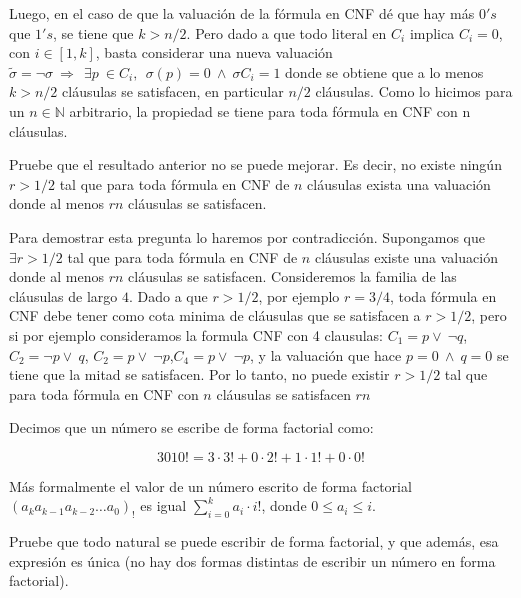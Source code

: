 \documentclass[letterpaper,10pt]{article}
\begin{document}
Luego, en el caso de que la valuación de la fórmula en CNF dé que hay más $0's$ que $1's$, se tiene que  $k>n/2$. Pero dado a que todo literal en $C_{i}$ implica $C_i=0$, con $i \in [1,k]$, basta considerar una nueva valuación $\widetilde{\sigma} = \neg \sigma\ \Rightarrow\ \ \exists p\ \in C_i,\ \ \sigma(p) = 0\ \wedge\ \sigma C_i = 1 $ donde se obtiene que a lo menos $k>n/2$ cláusulas se satisfacen, en particular $n/2$ cláusulas. Como lo hicimos para un $n \in \mathbb{N}$ arbitrario, la propiedad se tiene para toda fórmula en CNF con n cláusulas.
\\

\begin{tcolorbox}
 Pruebe que el resultado anterior no se puede mejorar. Es decir, no existe ningún $r >1/2$ tal que para toda fórmula en CNF de $n$ cláusulas exista una valuación donde al menos $rn$ cláusulas se satisfacen.
\end{tcolorbox}

Para demostrar esta pregunta lo haremos por contradicción. Supongamos que $\exists r>1/2$ tal que para toda fórmula en CNF de $n$ cláusulas existe una valuación donde al menos $rn$ cláusulas se satisfacen. Consideremos la familia de las cláusulas de largo $4$. Dado a que $r>1/2$, por ejemplo $r=3/4$, toda fórmula en CNF debe tener como cota minima de cláusulas que se satisfacen a $r>1/2$, pero si por ejemplo consideramos la formula CNF con 4 clausulas: $C_1 = p \vee\ \neg q$, $C_2 = \neg p \vee\  q$, $C_2 = p \vee\ \neg p$,$C_4 = p \vee\ \neg p$, y la valuación que hace $p=0\ \wedge\ q=0$ se tiene que la mitad se satisfacen. Por lo tanto, no puede existir $r>1/2$ tal que para toda fórmula en CNF con $n$ cláusulas se satisfacen $rn$
\\

\begin{tcolorbox}[colback=red!5!white,colframe=red!75!black]
 Decimos que un número se escribe de forma factorial como:

\begin{equation*}
3010!= 3\cdot 3!+0\cdot 2!+1\cdot 1!+0\cdot 0!
\end{equation*}

Más formalmente el valor de un número escrito de forma factorial $(a_k a_{k-1}a_{k-2}\ldots a_0)_!$ es igual $\sum_{i=0}^{k} a_i\cdot i!$, donde $0\leqslant a_i\leqslant i$.
\end{tcolorbox}

\begin{tcolorbox}
 Pruebe que todo natural se puede escribir de forma factorial, y que además, esa expresión es única (no hay dos formas distintas de escribir un número en forma factorial).
\end{tcolorbox}
\end{document}
